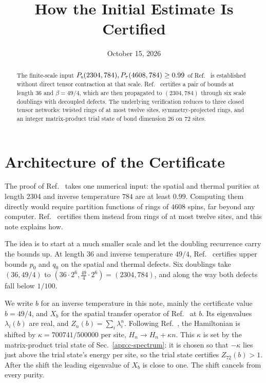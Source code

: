 \documentclass[aps,prl,reprint,amsmath,amssymb,nofootinbib,raggedbottom]{revtex4-2}
\begin{document}
\title{How the Initial Estimate Is Certified}
\date{October 15, 2026}
\begin{abstract}
The finite-scale input $P_{\mathrm s}(2304,784), P_{\tau}(4608,784) \ge 0.99$ of Ref.~\cite{main} is established without direct tensor contraction at that scale.
Ref.~\cite{source} certifies a pair of bounds at length $36$ and $\beta=49/4$, which are then propagated to $(2304,784)$ through six scale doublings with decoupled defects.
The underlying verification reduces to three closed tensor networks: twisted rings of at most twelve sites, symmetry-projected rings, and an integer matrix-product trial state of bond dimension $26$ on $72$ sites.
\end{abstract}
\maketitle
\setlength{\abovedisplayskip}{5pt plus 2pt minus 1pt}
\setlength{\belowdisplayskip}{5pt plus 2pt minus 1pt}

\appendix
\setcounter{secnumdepth}{2}
\setcounter{section}{8}

\section{Architecture of the Certificate}\label{app:c-plan}
The proof of Ref.~\cite{main} takes one numerical input: the spatial and
thermal purities at length $2304$ and inverse temperature $784$ are at
least $0.99$. Computing them directly would require partition functions of
rings of $4608$ spins, far beyond any computer. Ref.~\cite{source}
certifies them instead from rings of at most twelve sites, and this note
explains how.

The idea is to start at a much smaller scale and let the doubling
recurrence carry the bounds up. At length $36$ and inverse temperature
$49/4$, Ref.~\cite{source} certifies upper bounds $p_0$ and $q_0$ on the
spatial and thermal defects. Six doublings take $(36,49/4)$ to
$(36\cdot2^6,\tfrac{49}{4}\cdot2^6)=(2304,784)$, and along the way both
defects fall below $1/100$.

We write $b$ for an inverse temperature in this note, mainly the certificate
value $b=49/4$, and $X_b$ for the spatial transfer operator of
Ref.~\cite{main} at $b$. Its eigenvalues $\lambda_i(b)$ are real, and
$Z_n(b)=\sum_i\lambda_i^n$. Following Ref.~\cite{source}, the Hamiltonian
is shifted by $\kappa=700741/500000$ per site, $H_n\to H_n+\kappa n$. This
$\kappa$ is set by the matrix-product trial state of
Sec.~\ref{app:c-spectrum}: it is chosen so that $-\kappa$ lies just above the
trial state's energy per site, so the trial state certifies $Z_{72}(b)>1$.
After the shift the leading eigenvalue of $X_b$ is close to one. The shift
cancels from every purity.
\end{document}
